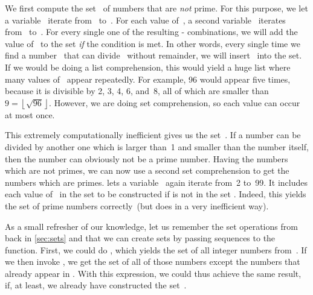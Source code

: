 We first compute the set~ of numbers that are \emph{not} prime.
For this purpose, we let a variable~ iterate from~ to~.
For each value of~, a second variable~ iterates from~ to~.
For every single one of the resulting \nobreakdashes- combinations, we will add the value of~ to the set \emph{if} the condition  is met.
In other words, every single time we find a number~ that can divide~ without remainder, we will insert~ into the set.
If we would be doing a list comprehension, this would yield a huge list where many values of~ appear repeatedly.
For example, 96 would appear five times, because it is divisible by 2, 3, 4, 6, and~8, all of which are smaller than~$9=\left\lfloor\sqrt{96}\right\rfloor$.
However, we are doing set comprehension, so each value can occur at most once.%
%
\begin{sloppypar}%
This extremely computationally inefficient gives us the set~.
If a number can be divided by another one which is larger than~1 and smaller than the number itself, then the number can obviously not be a prime number.
Having the numbers which are not primes, we can now use a second set comprehension to get the numbers which are primes.
 lets a variable~ again iterate from~2 to~99.
It includes each value of~ in the set to be constructed if  is not in the set .
Indeed, this yields the set of prime numbers correctly~(but does in a very inefficient way).%
\end{sloppypar}%
%
\begin{sloppypar}%
As a small refresher of our knowledge, let us remember the set operations from back in \cref{sec:sets} and that we can create sets by passing sequences to the  function.
First, we could do , which yields the set of all integer numbers from~.
If we then invoke , we get the set of all of those numbers except the numbers that already appear in .
With this expression, we could thus achieve the same result, if, at least, we already have constructed the set~.%
\end{sloppypar}%
